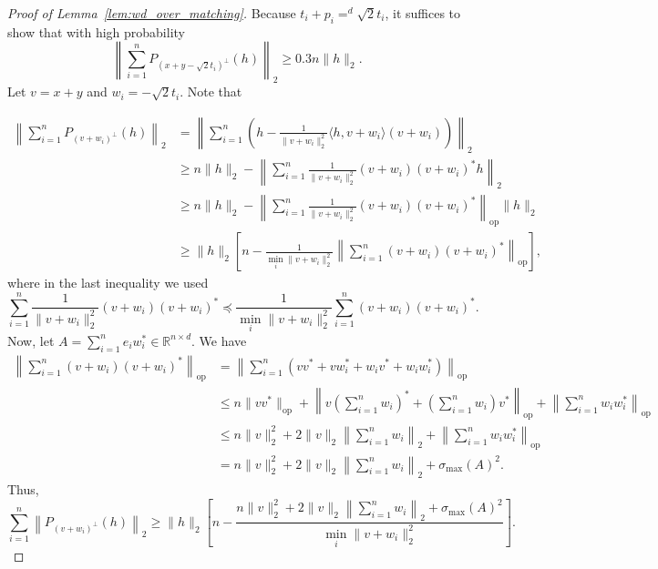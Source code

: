 \begin{proof}[Proof of Lemma~\ref{lem:wd_over_matching}]
Because $t_i + p_i =^d \sqrt{2}t_i$, it suffices to show that with high probability
\[
\left \| \sum_{i=1}^n P_{(x+y-\sqrt{2}t_i)^\perp}(h) \right\|_2 \geq   0.3 n\|h\|_2.
\]
Let $v = x+y$ and $w_i = -\sqrt{2}t_i$. Note that

\begin{align*}
\left \|  \sum_{i=1}^n P_{(v+w_i)^\perp}(h)\right\|_2 
&= \left \| \sum_{i=1}^n \left(h - \frac{1}{\|v+w_i\|_2^2}\langle h, v+ w_i \rangle (v+ w_i) \right)\right \|_2\\
&\geq n\|h\|_2 - \left \| \sum_{i=1}^n \frac{1}{\|v+w_i\|_2^2} (v+ w_i)(v+ w_i)^* h\right \|_2  \\
&\geq n\|h\|_2 - \left \| \sum_{i=1}^n \frac{1}{\|v+w_i\|_2^2} (v+ w_i)(v+ w_i)^* \right\|_{\text{op}} \|h\|_2\\
& \geq \|h\|_2 \left[n - \frac{1}{\min_{i}\|v+w_i\|_2^2} \left \| \sum_{i=1}^n (v+ w_i)(v+ w_i)^* \right\|_{\text{op}} \right],
\end{align*}
where in the last inequality we used 
\[
\sum_{i=1}^n \frac{1}{\|v+w_i\|_2^2} (v+ w_i)(v+ w_i)^* \preceq \frac{1}{\min_{i}\|v+w_i\|_2^2}  \sum_{i=1}^n (v+ w_i)(v+ w_i)^*.
\]
Now, let $A = \sum_{i=1}^n e_i w_i^* \in \mathbb{R}^{n\times d}$. We have  
\begin{align*}
\left \| \sum_{i=1}^n (v+ w_i)(v+ w_i)^* \right\|_{\text{op}} &= \left \| \sum_{i=1}^n (vv^* + vw_i^* + w_i v^* + w_i w_i^*) \right\|_{\text{op}}\\
& \leq n\|vv^*\|_{\text{op}} + \left\| v \left( \sum_{i=1}^n w_i \right)^* +  \left( \sum_{i=1}^n w_i \right)v^* \right\|_{\text{op}} + \left \| \sum_{i=1}^n w_i w_i^* \right\|_{\text{op}}\\
& \leq n \|v\|_2^2 + 2\|v\|_2\left \| \sum_{i=1}^n w_i \right\|_2 + \left \| \sum_{i=1}^n w_i w_i^* \right\|_{\text{op}}\\
& = n \|v\|_2^2 + 2\|v\|_2\left \| \sum_{i=1}^n w_i \right\|_2 + \sigma_{\max}(A)^2.
\end{align*}
Thus,
\[
\sum_{i=1}^n \left \| P_{(v+w_i)^\perp}(h)\right \|_2 \geq \|h\|_2\left[n - \frac{n \|v\|_2^2 + 2\|v\|_2\left \| \sum_{i=1}^n w_i \right\|_2 + \sigma_{\max}(A)^2}{\min_{i}\|v+w_i\|_2^2} \right].
\]


\end{proof}
